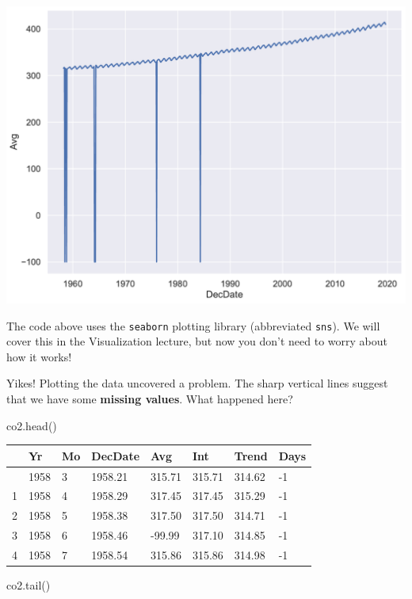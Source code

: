 \documentclass[
  letterpaper,
  DIV=11,
  numbers=noendperiod]{scrreprt}
\newenvironment{Shaded}{\begin{snugshade}}{\end{snugshade}}
\newcommand{\NormalTok}[1]{\textcolor[rgb]{0.00,0.23,0.31}{#1}}
\begin{document}
\includegraphics{eda/eda_files/figure-pdf/cell-62-output-1.pdf}

The code above uses the \texttt{seaborn} plotting library (abbreviated
\texttt{sns}). We will cover this in the Visualization lecture, but now
you don't need to worry about how it works!

Yikes! Plotting the data uncovered a problem. The sharp vertical lines
suggest that we have some \textbf{missing values}. What happened here?

\begin{Shaded}
\begin{Highlighting}[]
\NormalTok{co2.head()}
\end{Highlighting}
\end{Shaded}

\begin{longtable}[]{@{}llllllll@{}}
\toprule\noalign{}
& Yr & Mo & DecDate & Avg & Int & Trend & Days \\
\midrule\noalign{}
\endhead
\bottomrule\noalign{}
\endlastfoot
0 & 1958 & 3 & 1958.21 & 315.71 & 315.71 & 314.62 & -1 \\
1 & 1958 & 4 & 1958.29 & 317.45 & 317.45 & 315.29 & -1 \\
2 & 1958 & 5 & 1958.38 & 317.50 & 317.50 & 314.71 & -1 \\
3 & 1958 & 6 & 1958.46 & -99.99 & 317.10 & 314.85 & -1 \\
4 & 1958 & 7 & 1958.54 & 315.86 & 315.86 & 314.98 & -1 \\
\end{longtable}

\begin{Shaded}
\begin{Highlighting}[]
\NormalTok{co2.tail()}
\end{Highlighting}
\end{Shaded}
\end{document}
